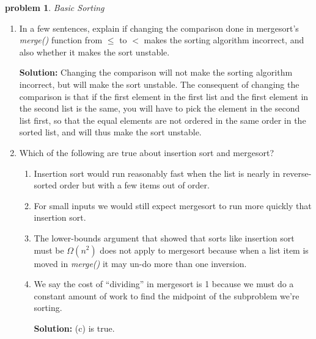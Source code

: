 \documentclass[10pt]{article}
\newtheorem{problem}{\sc\color{cit}problem}
\begin{document}
\begin{problem} Basic Sorting \end{problem}
    \begin{enumerate}   
    	\item In a few sentences, explain if changing the comparison done in mergesort's \emph{merge()} function from $\leq$ to $<$ makes the sorting algorithm incorrect, and also whether it makes the sort unstable.
    	
    	\textbf{Solution:}  Changing the comparison will not make the sorting algorithm incorrect, but will make the sort unstable. The consequent of changing the comparison is that if the first element in the first list and the first element in the second list is the same, you will have to pick the element in the second list first, so that the equal elements are not ordered in the same order in the sorted list, and will thus make the sort unstable.
    	
    	\item Which of the following are true about insertion sort and mergesort?
    		\begin{enumerate} 
    		\item Insertion sort would run reasonably fast when the list is nearly in reverse-sorted order but with a few items out of order.
    		\item For small inputs we would still expect mergesort to run more quickly that insertion sort.
    		\item The lower-bounds argument that showed that sorts like insertion sort must be $\Omega(n^2)$ does not apply to mergesort because when a list item
    		is moved in \emph{merge()} it may un-do more than one inversion.    
    		\item We say the cost of ``dividing'' in mergesort is 1 because we must do a constant amount of work to find the midpoint of the subproblem we're sorting.
    		
    	\textbf{Solution:}  (c) is true. 
    	
		\end{enumerate} 
    	
    \end{enumerate}       	
\end{document}
